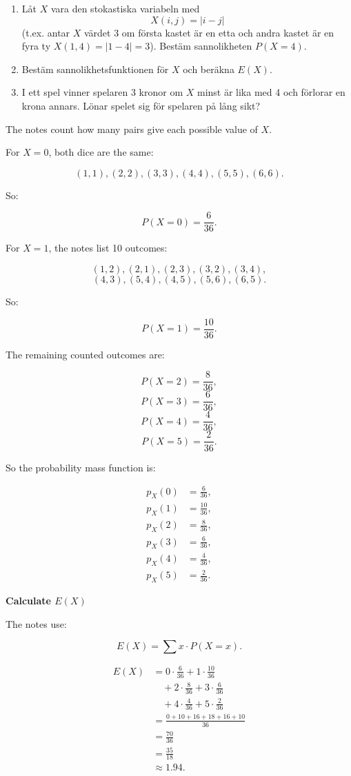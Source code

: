 \documentclass[10pt]{article}
\begin{document}
\begin{enumerate}[label=\alph*)]
\item
Låt \(X\) vara den stokastiska variabeln med
\[
X(i,j)=|i-j|
\]
(t.ex. antar \(X\) värdet 3 om första kastet är en etta och andra kastet
är en fyra ty \(X(1,4)=|1-4|=3\)).
Bestäm sannolikheten \(P(X=4)\).

\item
Bestäm sannolikhetsfunktionen för \(X\) och beräkna \(E(X)\).

\item
I ett spel vinner spelaren 3 kronor om \(X\) minst är lika med 4 och
förlorar en krona annars. Lönar spelet sig för spelaren på lång sikt?
\end{enumerate}

The notes count how many pairs give each possible value of \(X\).

For \(X=0\), both dice are the same:

\[
(1,1),(2,2),(3,3),
(4,4),(5,5),(6,6).
\]

So:

\[
P(X=0)=\frac{6}{36}.
\]

For \(X=1\), the notes list 10 outcomes:

\[
(1,2),(2,1),(2,3),(3,2),(3,4),
\]
\[
(4,3),(5,4),(4,5),(5,6),(6,5).
\]

So:

\[
P(X=1)=\frac{10}{36}.
\]

The remaining counted outcomes are:

\[
P(X=2)=\frac{8}{36},
\]
\[
P(X=3)=\frac{6}{36},
\]
\[
P(X=4)=\frac{4}{36},
\]
\[
P(X=5)=\frac{2}{36}.
\]

So the probability mass function is:

\begin{align*}
p_X(0)&=\frac{6}{36},\\
p_X(1)&=\frac{10}{36},\\
p_X(2)&=\frac{8}{36},\\
p_X(3)&=\frac{6}{36},\\
p_X(4)&=\frac{4}{36},\\
p_X(5)&=\frac{2}{36}.
\end{align*}

\textbf{Calculate \(E(X)\)}

The notes use:

\[
E(X)=\sum x\cdot P(X=x).
\]

\begin{align*}
E(X)
&=
0\cdot\frac{6}{36}
+1\cdot\frac{10}{36}\\
&\quad
+2\cdot\frac{8}{36}
+3\cdot\frac{6}{36}\\
&\quad
+4\cdot\frac{4}{36}
+5\cdot\frac{2}{36}\\[2mm]
&=
\frac{0+10+16+18+16+10}{36}\\[2mm]
&=
\frac{70}{36}\\[2mm]
&=
\frac{35}{18}\\[2mm]
&\approx
1.94.
\end{align*}
\end{document}
